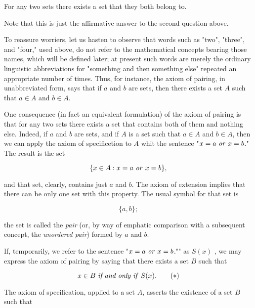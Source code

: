 \begin{named}  For any two sets there exists a set that they both belong to.
\end{named}


Note that this is just the affirmative answer to the second question above.

To reassure worriers, let us hasten to observe that words such as "two", "three", and "four," used above, do not refer to the mathematical concepts bearing those names, which will be defined later; at present such words are merely the ordinary linguistic abbreviations for "something and then something else" repeated an appropriate number of times. Thus, for instance, the axiom of pairing, in unabbreviated form, says that if $a$ and $b$ are sets, then there exists a set $A$ such that $a \in A$ and $b \in A$.

One consequence (in fact an equivalent formulation) of the axiom of pairing is that for any two sets there exists a set that contains both of them and nothing else. Indeed, if $a$ and $b$ are sets, and if $A$ is a set such that $a \in A$ and $b \in A$, then we can apply the axiom of specificetion to $A$ whit the sentence "$x = a \text{ \textit{or} } x = b$." The result is the set 

\begin{equation*}
\{ x \in A: x = a \text{ \textit{or} } x = b \},
\end{equation*}

and that set, clearly, contains just $a$ and $b$. The axiom of extension implies that there can be only one set with this property. The usual symbol for that set is

\begin{equation*}
\{ a, b \};
\end{equation*}

the set is called the \textit{pair} (or, by way of emphatic comparison with a subsequent concept, the \textit{unordered pair}) formed by $a$ and $b$. 

If, temporarily, we refer to the sentence "$x = a \text{ \textit{or} } x = b$."" as $S(x)$ , we may express the axiom of pairing by saying that there exists a set $B$ such that 

\begin{equation}
\label{eq3.1}
x \in B \text{ \textit{if and only if} } S(x). \tag{$\ast$}
\end{equation}

The axiom of specification, applied to a set $A$, asserts the existence of a set $B$ such that 

